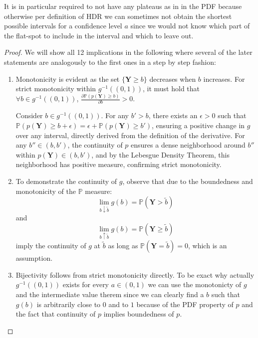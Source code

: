 It is in particular required to not have any plateaus as in in  the PDF because otherwise per definition of HDR we can sometimes not obtain the shortest possible intervals for a confidence level $a$ since we would not know which part of the flat-spot to include in the interval and which to leave out.

\begin{proof}

    We will show all 12 implications in the following where several of the later statements are analogously to the first ones in a step by step fashion:
    \begin{enumerate}
        \item\label{item:monotonicity} Monotonicity is evident as the set \(\{\mathbf{Y} \geq b\}\) decreases when \(b\) increases. For strict monotonicity within \(g^{-1}((0,1))\), it must hold that \(\forall b \in g^{-1}((0,1))\), \(\frac{\partial \mathbb{P}(p(\mathbf{Y}) \geq b)}{\partial b} > 0\).

        Consider \(b \in g^{-1}((0,1))\). For any \(b' > b\), there exists an \(\epsilon > 0\) such that \(\mathbb{P}(p(\mathbf{Y}) \geq b + \epsilon) = \epsilon + \mathbb{P}(p(\mathbf{Y}) \geq b')\), ensuring a positive change in \(g\) over any interval, directly derived from the definition of the derivative. For any \(b'' \in (b, b')\), the continuity of \(p\) ensures a dense neighborhood around \(b''\) within \(p(\mathbf{Y}) \in (b, b')\), and by the Lebesgue Density Theorem, this neighborhood has positive measure, confirming strict monotonicity.

        \item\label{item:continuity} To demonstrate the continuity of \(g\), observe that due to the boundedness and monotonicity of the \(\mathbb{P}\) measure:
        \begin{equation}
            \lim_{b \downarrow \tilde{b}} g(b) = \mathbb{P}(\mathbf{Y} > \tilde{b})
        \end{equation}
        and
        \begin{equation}
            \lim_{b \uparrow \tilde{b}} g(b) = \mathbb{P}(\mathbf{Y} \geq \tilde{b})
        \end{equation}
        imply the continuity of \(g\) at \(\tilde{b}\) as long as \(\mathbb{P}(\mathbf{Y} = \tilde{b}) = 0\), which is an assumption.

        \item\label{item:bijectivity} Bijectivity follows from strict monotonicity directly. To be exact why actually $g^{-1}((0,1))$ exists for every $a \in (0,1)$ we can use the monotonicty of $g$ and the intermediate value therem since we can clearly find a $b$ such that $g(b)$ is arbitrarily close to $0$ and to $1$ because of the PDF property of $p$ and the fact that continuity of $p$ implies boundedness of $p$.


\end{enumerate}
\end{proof}
